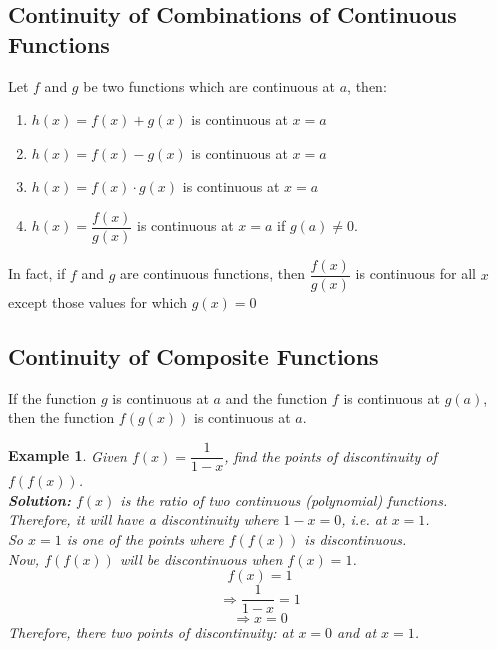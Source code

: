 \documentclass[14]{article}
\newtheorem*{ex}{Example}
\theoremstyle{definition}
\begin{document}
\subsection{Continuity of Combinations of Continuous Functions}
Let $f$ and $g$ be two functions which are continuous at $a$, then:
\begin{enumerate}
\item $h(x) = f(x) + g(x)$ is continuous at 
$x = a$
\item $h(x) = f(x) - g(x)$ is continuous at $x = a$
\item $h(x) = f(x)\cdot g(x)$ is continuous at $x = a$
\item $h(x) = \dfrac{f(x)}{g(x)}$ is continuous at $x = a$ if $g(a) \neq 0$.
\end{enumerate}
In fact, if $f$ and $g$ are continuous functions, then $\dfrac{f(x)}{g(x)}$ is continuous for all $x$ except those values for which $g(x)=0$
\subsection{Continuity of Composite Functions}
If the function $g$ is continuous at $a$ and the function $f$ is continuous at $g(a)$, then the function $f(g(x))$ is continuous at $a$.
\begin{ex}
Given $f(x) = \dfrac{1}{1-x}$, find the points of discontinuity of $f(f(x))$.\\
\textbf{Solution: }$f(x)$ is the ratio of two continuous (polynomial) functions. Therefore, it will have a discontinuity where $1 - x = 0$, i.e. at $x = 1$.\\
So $x = 1$ is one of the points where $f(f(x))$ is discontinuous.\\
Now, $f(f(x))$ will be discontinuous when $f(x) = 1$.\\
\[f(x) = 1\]
\[\Rightarrow \dfrac{1}{1-x}=1\]
\[\Rightarrow x = 0\]
Therefore, there two points of discontinuity: at $x = 0$ and at $x = 1$.
\end{ex}
\pagebreak
\end{document}
